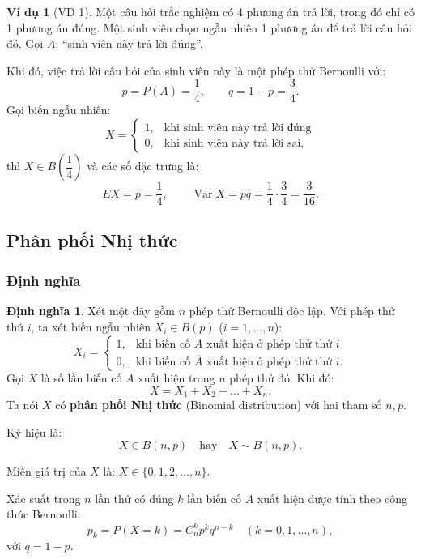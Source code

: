 \documentclass[12pt,a4paper]{article}
\theoremstyle{definition}
\newtheorem{dinhnghia}{Định nghĩa}[section]
\newtheorem{vidu}{Ví dụ}[section]
\begin{document}
\begin{vidu}[VD 1]
Một câu hỏi trắc nghiệm có 4 phương án trả lời, trong đó chỉ có 1 phương án đúng. Một sinh viên chọn ngẫu nhiên 1 phương án để trả lời câu hỏi đó.
Gọi $A$: ``sinh viên này trả lời đúng''.

Khi đó, việc trả lời câu hỏi của sinh viên này là một phép thử Bernoulli với:
\[
p = P(A) = \frac{1}{4}, \qquad q = 1 - p = \frac{3}{4}.
\]
Gọi biến ngẫu nhiên:
\[
X = \begin{cases} 
1, & \text{khi sinh viên này trả lời đúng} \\ 
0, & \text{khi sinh viên này trả lời sai}, 
\end{cases}
\]
thì $X \in B\left(\dfrac{1}{4}\right)$ và các số đặc trưng là:
\[
EX = p = \frac{1}{4}, \qquad \operatorname{Var} X = pq = \frac{1}{4} \cdot \frac{3}{4} = \frac{3}{16}.
\]
\end{vidu}

\subsection{Phân phối Nhị thức}

\subsubsection{Định nghĩa}

\begin{dinhnghia}
Xét một dãy gồm $n$ phép thử Bernoulli độc lập. Với phép thử thứ $i$, ta xét biến ngẫu nhiên $X_i \in B(p)$ ($i = 1, \dots, n$):
\[
X_i = \begin{cases} 
1, & \text{khi biến cố } A \text{ xuất hiện ở phép thử thứ } i \\ 
0, & \text{khi biến cố } \overline{A} \text{ xuất hiện ở phép thử thứ } i. 
\end{cases}
\]
Gọi $X$ là số lần biến cố $A$ xuất hiện trong $n$ phép thử đó. Khi đó:
\[
X = X_1 + X_2 + \dots + X_n.
\]
Ta nói $X$ có \textbf{phân phối Nhị thức} (Binomial distribution) với hai tham số $n, p$.

Ký hiệu là:
\[
X \in B(n, p) \quad \text{hay} \quad X \sim B(n, p).
\]

Miền giá trị của $X$ là: $X \in \{0, 1, 2, \dots, n\}$.

Xác suất trong $n$ lần thử có đúng $k$ lần biến cố $A$ xuất hiện được tính theo công thức Bernoulli:
\[
p_k = P(X = k) = C_n^k p^k q^{n - k} \quad (k = 0, 1, \dots, n),
\]
với $q = 1 - p$.
\end{dinhnghia}
\end{document}
